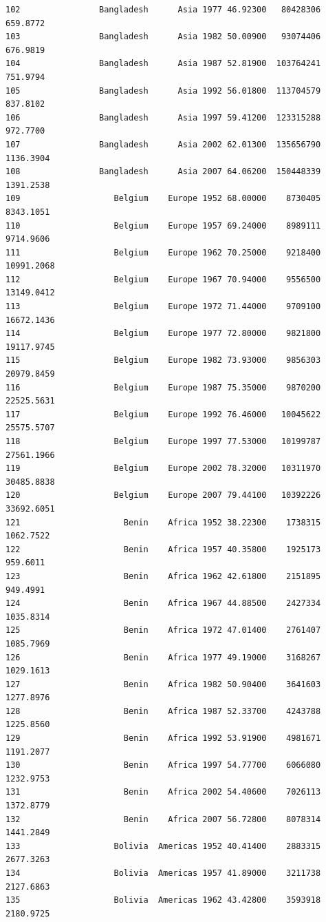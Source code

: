 \documentclass[
  letterpaper,
  DIV=11,
  numbers=noendperiod]{scrreprt}
\begin{document}
\begin{verbatim}
102                Bangladesh      Asia 1977 46.92300   80428306    659.8772
103                Bangladesh      Asia 1982 50.00900   93074406    676.9819
104                Bangladesh      Asia 1987 52.81900  103764241    751.9794
105                Bangladesh      Asia 1992 56.01800  113704579    837.8102
106                Bangladesh      Asia 1997 59.41200  123315288    972.7700
107                Bangladesh      Asia 2002 62.01300  135656790   1136.3904
108                Bangladesh      Asia 2007 64.06200  150448339   1391.2538
109                   Belgium    Europe 1952 68.00000    8730405   8343.1051
110                   Belgium    Europe 1957 69.24000    8989111   9714.9606
111                   Belgium    Europe 1962 70.25000    9218400  10991.2068
112                   Belgium    Europe 1967 70.94000    9556500  13149.0412
113                   Belgium    Europe 1972 71.44000    9709100  16672.1436
114                   Belgium    Europe 1977 72.80000    9821800  19117.9745
115                   Belgium    Europe 1982 73.93000    9856303  20979.8459
116                   Belgium    Europe 1987 75.35000    9870200  22525.5631
117                   Belgium    Europe 1992 76.46000   10045622  25575.5707
118                   Belgium    Europe 1997 77.53000   10199787  27561.1966
119                   Belgium    Europe 2002 78.32000   10311970  30485.8838
120                   Belgium    Europe 2007 79.44100   10392226  33692.6051
121                     Benin    Africa 1952 38.22300    1738315   1062.7522
122                     Benin    Africa 1957 40.35800    1925173    959.6011
123                     Benin    Africa 1962 42.61800    2151895    949.4991
124                     Benin    Africa 1967 44.88500    2427334   1035.8314
125                     Benin    Africa 1972 47.01400    2761407   1085.7969
126                     Benin    Africa 1977 49.19000    3168267   1029.1613
127                     Benin    Africa 1982 50.90400    3641603   1277.8976
128                     Benin    Africa 1987 52.33700    4243788   1225.8560
129                     Benin    Africa 1992 53.91900    4981671   1191.2077
130                     Benin    Africa 1997 54.77700    6066080   1232.9753
131                     Benin    Africa 2002 54.40600    7026113   1372.8779
132                     Benin    Africa 2007 56.72800    8078314   1441.2849
133                   Bolivia  Americas 1952 40.41400    2883315   2677.3263
134                   Bolivia  Americas 1957 41.89000    3211738   2127.6863
135                   Bolivia  Americas 1962 43.42800    3593918   2180.9725

\end{verbatim}
\end{document}
